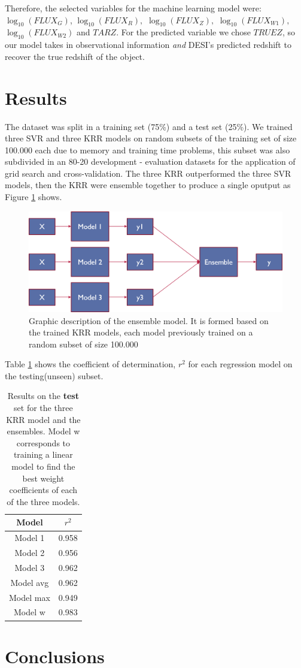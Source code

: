 \documentclass[]{article}
\begin{document}
Therefore, the selected variables for the machine learning model were: $\log_{10}(FLUX_G)$, $\log_{10}(FLUX_R),$ $\log_{10}(FLUX_Z),$  $\log_{10}(FLUX_{W1}),$  $\log_{10}(FLUX_{W2})$ and $TARZ$. For the predicted variable we chose $TRUEZ$, so our model takes in observational information \textit{and} DESI's predicted redshift to recover the true redshift of the object. 

\section{Results}
The dataset was split in a training set (75\%) and a test set (25\%). We trained three SVR and three KRR models on random subsets of the training set of size 100.000 each due to memory and training time problems, this subset was also subdivided in an 80-20 development - evaluation datasets for the application of grid search and cross-validation. The three KRR outperformed the three SVR models, then the KRR were ensemble together to produce a single oputput as Figure \ref{fig:ensemblemodel} shows.
  
\begin{figure}[h!]
	\centering
	\includegraphics[width=1\linewidth]{TeX_files/Imagenes/ensemble_model}
	\caption{Graphic description of the ensemble model. It is formed based on the trained KRR models, each model previously trained on a random subset of size 100.000}
	\label{fig:ensemblemodel}
\end{figure}

Table \ref{table:test-result} shows the coefficient of determination, $r^2$ for each regression model on the testing(unseen) subset. 

\begin{table}[h!]
	\centering
	\begin{tabular}{|c|c|}
		\hline 
		Model & $r^2$ \\ 
		\hline 
		Model 1 & 0.958 \\ 
		\hline 
		Model 2 & 0.956 \\ 
		\hline 
		Model 3 & 0.962 \\ 
		\hline 
		Model avg & 0.962 \\ 
		\hline 
		Model max & 0.949 \\ 
		\hline 
		Model w & 0.983 \\ 
		\hline 
	\end{tabular} 
	\caption{Results on the \textbf{test} set for the three KRR model and the ensembles. Model w corresponds to training a linear model to find the best weight coefficients of each of the three models.}
	\label{table:test-result}
\end{table}

\section{Conclusions}
\end{document}
